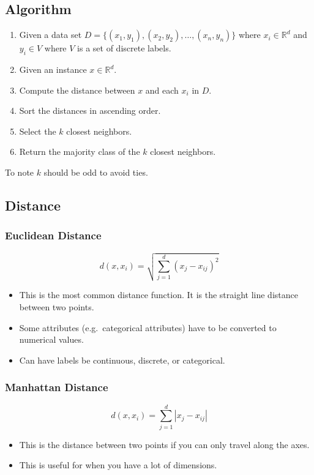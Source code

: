 \documentclass[12pt]{article}
\begin{document}
        \subsection{Algorithm}
            \begin{enumerate}
                \item Given a data set $D = \{(x_1, y_1), (x_2, y_2), \dots, (x_n, y_n)\}$ where $x_i \in \mathbb{R}^d$ and $y_i \in V$ where $V$ is a set of discrete labels.
                \item Given an instance $x \in \mathbb{R}^d$.
                \item Compute the distance between $x$ and each $x_i$ in $D$.
                \item Sort the distances in ascending order.
                \item Select the $k$ closest neighbors.
                \item Return the majority class of the $k$ closest neighbors.
            \end{enumerate}
            To note $k$ should be odd to avoid ties.
        \subsection{Distance}
            \subsubsection{Euclidean Distance}
                \begin{equation}
                    d(x, x_i) = \sqrt{\sum_{j=1}^d {(x_j - x_{ij})}^2}
                \end{equation}
                \begin{itemize}
                    \item This is the most common distance function. It is the straight line distance between two points.
                    \item Some attributes (e.g.\ categorical attributes) have to be converted to numerical values.
                    \item Can have labels be continuous, discrete, or categorical.
                \end{itemize}
            \subsubsection{Manhattan Distance}
                \begin{equation}
                    d(x, x_i) = \sum_{j=1}^d |x_j - x_{ij}|
                \end{equation}
                \begin{itemize}
                    \item This is the distance between two points if you can only travel along the axes.
                    \item This is useful for when you have a lot of dimensions.
                \end{itemize}
\end{document}
